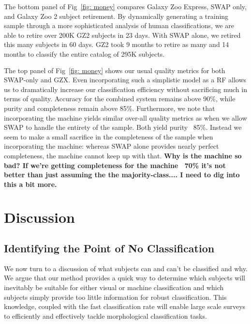 \documentclass[twocolumn]{aastex6}
\begin{document}
The bottom panel of Fig~\ref{fig: money} compares  Galaxy Zoo Express, 
SWAP only, and Galaxy Zoo 2 subject retirement.
By dynamically generating a training sample
through a more sophisticated analysis of human classifications, we are able
to retire over 200K GZ2 subjects in 23 days.  With SWAP alone, we retired this
many subjects in 60 days. GZ2 took 9 months to retire as many and 14 months 
to classify the entire catalog of 295K subjects. 

The top panel of Fig~\ref{fig: money} shows our usual quality metrics for both 
SWAP-only and GZX.  Even incorporating such a simplistic model as a RF allows
us to dramatically increase our classification efficiency without sacrificing much 
in terms of quality. Accuracy for the combined system remains above 90\%, while
purity and completeness remain above 85\%. Furthermore, we note that 
incorporating the machine yields similar over-all quality metrics as when we 
allow SWAP to handle the entirety of the sample. Both yield purity ~85\%. 
Instead we seem to make a small sacrifice in the completeness of the sample
when incorporating the machine: whereas SWAP alone provides nearly perfect
completeness, the machine cannot keep up with that.
 \textbf{Why is the machine so bad? If we're getting completeness for the machine ~70\% it's not better than just assuming the the majority-class.... I need to dig into this a bit more.}



\section{Discussion}

\subsection{Identifying the Point of No Classification}

We now turn to a discussion of what subjects can and can't be classified and why. 
We argue that our method provides a quick way to determine which subjects will
inevitably be suitable for either visual or machine classification and which subjects
simply provide too little information for robust classification. This knowledge, coupled
with the fast classification rate will enable large scale surveys to efficiently and effectively
tackle morphological classification tasks. 
\end{document}
